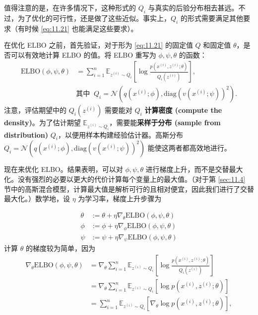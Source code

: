 值得注意的是，在许多情况下，这种形式的 $Q_i$ 与真实的后验分布相去甚远。不过，为了优化的可行性，还是做了这些近似。事实上，$Q_i$ 的形式需要满足其他要求（有时候 \eqref{eq:11.21} 也能满足这些要求）。

在优化 ELBO 之前，首先验证，对于形为 \eqref{eq:11.21} 的固定值 $Q$ 和固定值 $\theta$，是否可以有效地计算 ELBO 的值。将 ELBO 重写为 $\phi, \psi, \theta$ 的函数：
\begin{align}
    \text{ELBO}(\phi, \psi, \theta) 
    &= \sum_{i=1}^n \mathbb{E}_{z^{(i)} \sim Q_i} \left[ \log \frac{p(x^{(i)}, z^{(i)}; \theta)}{Q_i(z^{(i)})} \right], \label{eq:11.22}\\
    &\text{其中 } \  Q_i = \mathcal{N}(q(x^{(i)}; \phi), \text{diag}(v(x^{(i)}; \psi))^2). \nonumber
\end{align}
注意，评估期望中的 $Q_i(z^{(i)})$ 需要能对 $Q_i$ \textbf{计算密度 (compute the density)}。为了估计期望 $\mathbb{E}_{z^{(i)} \sim Q_i}$，需要能\textbf{采样于分布 (sample from distribution)} $Q_i$，以便用样本构建经验估计器。高斯分布 $Q_i = \mathcal{N}(q(x^{(i)}; \phi), \text{diag}(v(x^{(i)}; \psi))^2)$ 能使这两者都高效地进行。

现在来优化 ELBO。结果表明，可以对 $\phi, \psi, \theta$ 进行梯度上升，而不是交替最大化。没有强烈的必要以更大的代价计算每个变量上的最大值。（对于第 \ref{sec:11.4} 节中的高斯混合模型，计算最大值是解析可行的且相对便宜，因此我们进行了交替最大化。）数学地，设 $\eta$ 为学习率，梯度上升步骤为

\begin{align*}
    \theta &:= \theta + \eta \nabla_\theta \text{ELBO}(\phi, \psi, \theta) \\
    \phi &:= \phi + \eta \nabla_\phi \text{ELBO}(\phi, \psi, \theta) \\
    \psi &:= \psi + \eta \nabla_\psi \text{ELBO}(\phi, \psi, \theta)
\end{align*}
计算 $\theta$ 的梯度较为简单，因为
\begin{align}
    \nabla_\theta \text{ELBO}(\phi, \psi, \theta) 
    &= \nabla_\theta \sum_{i=1}^n \mathbb{E}_{z^{(i)} \sim Q_i} \left[ \log \frac{p(x^{(i)}, z^{(i)}; \theta)}{Q_i(z^{(i)})} \right] 
    \nonumber\\
    &= \nabla_\theta \sum_{i=1}^n \mathbb{E}_{z^{(i)} \sim Q_i} \left[ \log p(x^{(i)}, z^{(i)}; \theta) \right]
    \nonumber\\
    &= \sum_{i=1}^n \mathbb{E}_{z^{(i)} \sim Q_i} \left[ \nabla_\theta \log p(x^{(i)}, z^{(i)}; \theta) \right],\label{eq:11.23}
\end{align} 

